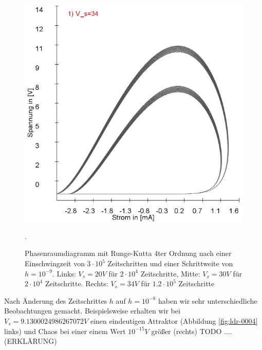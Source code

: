 \documentclass{scrartcl}
\begin{document}
\begin{figure}
\includegraphics[scale=0.28]{schwing-runge-nach300k-weitere120k-10-9-34V}
\caption{Phasenraumdiagramm mit Runge-Kutta 4ter Ordnung nach einer Einschwingzeit von  $3\cdot10^5$ Zeitschritten und einer Schrittweite von $h=10^{-9}$. Links: $V_s=20V$ für $2\cdot10^4$ Zeitschritte, Mitte: $V_s=30V$ für $2\cdot10^4$ Zeitschritte. Rechts: $V_s=34V$ für $1.2\cdot10^5$ Zeitschritte}. 
\label{fig:ldr-0003}
\end{figure}
\newline
Nach Änderung des Zeitschrittes $h$ auf $h=10^{-8}$ haben wir sehr unterschiedliche Beobachtungen gemacht. Beispielsweise erhalten wir bei $V_s=9.1300024986267072V$ einen eindeutigen Attraktor (Abbildung \ref{fig:ldr-0004} links) und Chaos bei einer einem Wert $10^{-15}V$ größer (rechts) TODO ....(ERKLÄRUNG)
\end{document}
